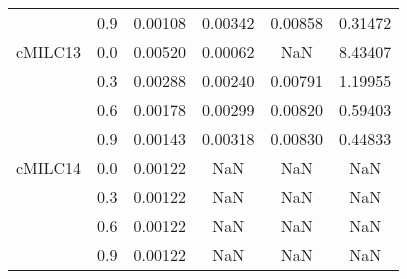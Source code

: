 \begin{longtable}{cccccc}
        & 0.9 & 0.00108 & 0.00342 & 0.00858 & 0.31472 \\
cMILC13 & 0.0 & 0.00520 & 0.00062 & NaN & 8.43407 \\
        & 0.3 & 0.00288 & 0.00240 & 0.00791 & 1.19955 \\
        & 0.6 & 0.00178 & 0.00299 & 0.00820 & 0.59403 \\
        & 0.9 & 0.00143 & 0.00318 & 0.00830 & 0.44833 \\
cMILC14 & 0.0 & 0.00122 & NaN & NaN & NaN \\
        & 0.3 & 0.00122 & NaN & NaN & NaN \\
        & 0.6 & 0.00122 & NaN & NaN & NaN \\
        & 0.9 & 0.00122 & NaN & NaN & NaN \\
\end{longtable}
